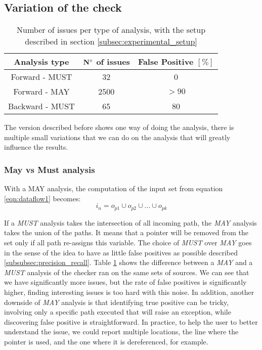 \subsection{Variation of the check}
\label{subsec:rule_variation}

\begin{table}[h]
	\centering
	\caption{Number of issues per type of analysis, with the setup described in section \ref{subsec:experimental_setup}}
	\label{table:issue_per_analysis_type}
	\begin{tabular}{|c|c|c|}
		\hline
		\bf Analysis type &  \bf $\bf N^{\circ}$  of issues &  \bf False Positive $[\%]$ \\ \hline
		Forward - MUST &  32 &  0 \\ 
		Forward - MAY &  2500 & $> 90$  \\ 
		Backward - MUST &  65 & 80 \\ \hline
	\end{tabular}
\end{table}

The version described before shows one way of doing the analysis, there is multiple small variations that we can do on the analysis that will greatly influence the results.

\subsubsection{May vs Must analysis}
\label{subsubsec:may_vs_must}

With a MAY analysis, the computation of the input set from equation \ref{eqn:dataflow1} becomes:
\begin{equation}\label{eqn:mayvsmust}
i_{n} = o_{p1}  \cup   o_{p2}  \cup  ... \cup   o_{pk}
\end{equation}

If a \emph{MUST} analysis takes the intersection of all incoming path, the \emph{MAY} analysis takes the union of the paths. 
It means that a pointer will be removed from the set only if all path re-assigns this variable.
The choice of \emph{MUST} over \emph{MAY} goes in the sense of the idea to have as little false positives as possible described \ref{subsubsec:precision_recall}.
Table \ref{table:issue_per_analysis_type} shows the difference between a \emph{MAY} and a \emph{MUST} analysis of the checker ran on the same sets of sources.
We can see that we have significantly more issues, but the rate of false positives is significantly higher, finding interesting issues is too hard with this noise. 
In addition, another downside of \emph{MAY} analysis is that identifying true positive can be tricky, involving only a specific path executed that will raise an exception, while discovering false positive is straightforward.
In practice, to help the user to better understand the issue, we could report multiple locations, the line where the pointer is used, and the one where it is dereferenced, for example.

